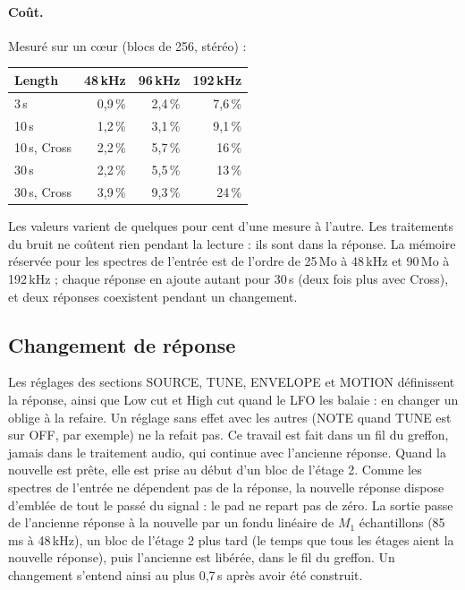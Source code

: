 \documentclass[a4paper,11pt]{article}
\begin{document}
\paragraph{Coût.} Mesuré sur un cœur (blocs de 256, stéréo) :
\begin{center}
\small
\begin{tabular}{@{}l r r r@{}}
\toprule
Length & 48\,kHz & 96\,kHz & 192\,kHz \\
\midrule
3\,s  & 0,9\,\% & 2,4\,\% & 7,6\,\% \\
10\,s & 1,2\,\% & 3,1\,\% & 9,1\,\% \\
10\,s, Cross & 2,2\,\% & 5,7\,\% & 16\,\% \\
30\,s & 2,2\,\% & 5,5\,\% & 13\,\% \\
30\,s, Cross & 3,9\,\% & 9,3\,\% & 24\,\% \\
\bottomrule
\end{tabular}
\end{center}
Les valeurs varient de quelques pour cent d'une mesure à l'autre. Les traitements du
bruit ne coûtent rien pendant la lecture : ils sont dans la réponse. La mémoire réservée pour les
spectres de l'entrée est de l'ordre de 25\,Mo à 48\,kHz et 90\,Mo à 192\,kHz ; chaque réponse en
ajoute autant pour 30\,s (deux fois plus avec Cross), et deux réponses coexistent pendant un
changement.

\subsection{Changement de réponse}\label{sec:changement}

Les réglages des sections SOURCE, TUNE, ENVELOPE et MOTION définissent la réponse, ainsi que Low
cut et High cut quand le LFO les balaie : en changer un oblige à la refaire. Un
réglage sans effet avec les autres (NOTE quand TUNE est sur OFF, par exemple) ne la refait pas.
Ce travail est fait dans un fil du greffon, jamais dans le traitement audio, qui continue avec
l'ancienne réponse. Quand la nouvelle est prête, elle est prise au début d'un bloc de l'étage 2.
Comme les spectres de l'entrée ne dépendent pas de la réponse, la nouvelle réponse dispose
d'emblée de tout le passé du signal : le pad ne repart pas de zéro. La sortie passe de l'ancienne
réponse à la nouvelle par un fondu linéaire de $M_1$ échantillons (85\,ms à 48\,kHz), un bloc de
l'étage 2 plus tard (le temps que tous les étages aient la nouvelle réponse), puis l'ancienne est
libérée, dans le fil du greffon. Un changement s'entend ainsi au plus 0,7\,s après avoir été
construit.
\end{document}
